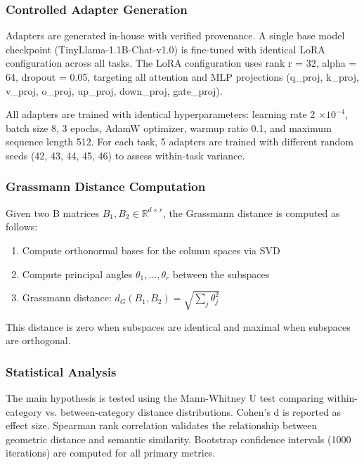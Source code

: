 
\subsubsection{Controlled Adapter Generation}

Adapters are generated in-house with verified provenance. A single base model checkpoint (TinyLlama-1.1B-Chat-v1.0) is fine-tuned with identical LoRA configuration across all tasks. The LoRA configuration uses rank r = 32, alpha = 64, dropout = 0.05, targeting all attention and MLP projections (q\_proj, k\_proj, v\_proj, o\_proj, up\_proj, down\_proj, gate\_proj).

All adapters are trained with identical hyperparameters: learning rate 2 $\times 10^{-4}$, batch size 8, 3 epochs, AdamW optimizer, warmup ratio 0.1, and maximum sequence length 512. For each task, 5 adapters are trained with different random seeds (42, 43, 44, 45, 46) to assess within-task variance.

\subsubsection{Grassmann Distance Computation}

Given two B matrices $B_1, B_2 \in \mathbb{R}^{d\times r}$, the Grassmann distance is computed as follows:

\begin{enumerate}
\item Compute orthonormal bases for the column spaces via SVD
\item Compute principal angles $\theta_1, \ldots, \theta_r$ between the subspaces
\item Grassmann distance: $d_G(B_1, B_2) = \sqrt{\sum_j \theta_j^{2}}$
\end{enumerate}

This distance is zero when subspaces are identical and maximal when subspaces are orthogonal.

\subsubsection{Statistical Analysis}

The main hypothesis is tested using the Mann-Whitney U test comparing within-category vs. between-category distance distributions. Cohen's d is reported as effect size. Spearman rank correlation validates the relationship between geometric distance and semantic similarity. Bootstrap confidence intervals (1000 iterations) are computed for all primary metrics.
